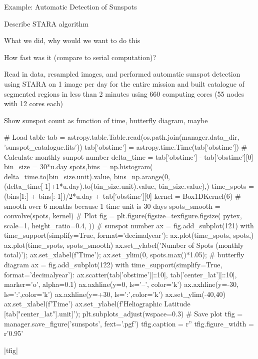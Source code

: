 \begin{block}{Example: Automatic Detection of Sunspots}

Describe STARA algorithm \citet{watson_modelling_2009}

What we did, why would we want to do this

How fast was it (compare to serial computation)? 

Read in data, resampled images, and performed automatic sunspot detection using STARA on 1 image per day for the entire mission and built catalogue of segmented regions in less than 2 minutes using 660 computing cores (55 nodes with 12 cores each)

Show sunspot count as function of time, butterfly diagram, maybe 

\begin{pycode}[manager]
# Load table
tab = astropy.table.Table.read(os.path.join(manager.data_dir, 'sunspot_catalogue.fits'))
tab['obstime'] = astropy.time.Time(tab['obstime'])
# Calculate monthly sunpot number
delta_time = tab['obstime'] - tab['obstime'][0]
bin_size = 30*u.day
spots,bins = np.histogram(
    delta_time.to(bin_size.unit).value,
    bins=np.arange(0,(delta_time[-1]+1*u.day).to(bin_size.unit).value, bin_size.value),)
time_spots = (bins[1:] + bins[:-1])/2*u.day + tab['obstime'][0]
kernel = Box1DKernel(6)  # smooth over 6 months because 1 time unit is 30 days
spots_smooth = convolve(spots, kernel)
# Plot
fig = plt.figure(figsize=texfigure.figsize(
    pytex,
    scale=1,
    height_ratio=0.4,
))
# sunspot number
ax = fig.add_subplot(121)
with time_support(simplify=True, format='decimalyear'):
    ax.plot(time_spots, spots,)
    ax.plot(time_spots, spots_smooth)
ax.set_ylabel('Number of Spots (monthly total)');
ax.set_xlabel(f'Time');
ax.set_ylim(0, spots.max()*1.05);
# butterfly diagram
ax = fig.add_subplot(122)
with time_support(simplify=True, format='decimalyear'):
    ax.scatter(tab['obstime'][::10], tab['center_lat'][::10],
    marker='o', alpha=0.1)
ax.axhline(y=0, ls='--', color='k')
ax.axhline(y=-30, ls=':',color='k')
ax.axhline(y=+30, ls=':',color='k')
ax.set_ylim(-40,40)
ax.set_xlabel(f'Time')
ax.set_ylabel(f'Heliographic Latitude [{tab["center_lat"].unit}]');
plt.subplots_adjust(wspace=0.3)
# Save plot
tfig = manager.save_figure('sunspots', fext='.pgf')
tfig.caption = r''
tfig.figure_width = r'0.95\columnwidth'
\end{pycode}
\py[manager]|tfig|

\end{block}